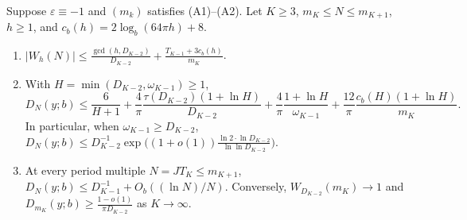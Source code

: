 \documentclass[11pt]{article}
\begin{document}
\begin{theorem}\label{thm:sharpened-weyl}
Suppose $\varepsilon\equiv-1$ and $(m_k)$ satisfies \textup{(A1)}--\textup{(A2)}. Let $K\ge3$, $m_K\le N\le m_{K+1}$, $h\ge1$, and $c_b(h)=2\log_b(64\pi h)+8$.
\begin{enumerate}[label=\textup{(\roman*)},nosep]
\item $|W_h(N)|\le\frac{\gcd(h,D_{K-2})}{D_{K-2}}+\frac{T_{K-1}+3c_b(h)}{m_K}$.
\item With $H=\min(D_{K-2},\omega_{K-1})\ge1$,
\[
D_N(y;b)\le\frac6{H+1}+\frac4\pi\frac{\tau(D_{K-2})(1+\ln H)}{D_{K-2}}+\frac4\pi\frac{1+\ln H}{\omega_{K-1}}+\frac{12}{\pi}\frac{c_b(H)(1+\ln H)}{m_K}.
\]
In particular, when $\omega_{K-1}\ge D_{K-2}$, $D_N(y;b)\le D_{K-2}^{-1}\exp\bigl((1+o(1))\frac{\ln 2\cdot\ln D_{K-2}}{\ln\ln D_{K-2}}\bigr)$.
\item At every period multiple $N=JT_K\le m_{K+1}$, $D_N(y;b)\le D_{K-1}^{-1}+O_b((\ln N)/N)$. Conversely, $W_{D_{K-2}}(m_K)\to1$ and $D_{m_K}(y;b)\ge\frac{1-o(1)}{\pi D_{K-2}}$ as $K\to\infty$.
\end{enumerate}
\end{theorem}
\end{document}
